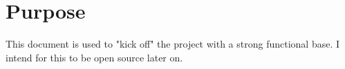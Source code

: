 \section{Purpose}
This document is used to "kick off" the project with a strong functional base. 
I intend for this to be open source later on.

